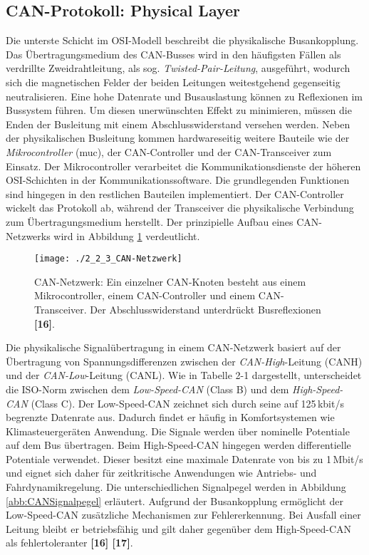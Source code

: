 \subsection{CAN-Protokoll: Physical Layer} \label{subsec:PhysicalLayer}
Die unterste Schicht im \acs{OSI}-Modell beschreibt die physikalische Busankopplung. Das Übertragungsmedium des \acs{CAN}-Busses wird in den häufigsten Fällen als verdrillte Zweidrahtleitung, als sog. \emph{Twisted-Pair-Leitung}, ausgeführt, wodurch sich die magnetischen Felder der beiden Leitungen weitestgehend gegenseitig neutralisieren. Eine hohe Datenrate und Busauslastung können zu Reflexionen im Bussystem führen. Um diesen unerwünschten Effekt zu minimieren, müssen die Enden der Busleitung mit einem Abschlusswiderstand versehen werden. Neben der physikalischen Busleitung kommen hardwareseitig weitere Bauteile wie der \emph{Mikrocontroller} (\acs{muc}), der \acs{CAN}-Controller und der \acs{CAN}-Transceiver zum Einsatz. Der Mikrocontroller verarbeitet die Kommunikationsdienste der höheren \acs{OSI}-Schichten in der Kommunikationssoftware. Die grundlegenden Funktionen sind hingegen in den restlichen Bauteilen implementiert. Der \acs{CAN}-Controller wickelt das Protokoll ab, während der Transceiver die physikalische Verbindung zum Übertragungsmedium herstellt. Der prinzipielle Aufbau eines \acs{CAN}-Netzwerks wird in Abbildung \ref{abb:CANNetzwerk} verdeutlicht.

\begin{figure}[!htbp]
	\centering
	\texttt{[image: ./2\_2\_3\_CAN-Netzwerk]}
	\caption[CAN-Netzwerk]{CAN-Netzwerk: Ein einzelner \acs{CAN}-Knoten besteht aus einem Mikrocontroller, einem \acs{CAN}-Controller und einem \acs{CAN}-Transceiver. Der Abschlusswiderstand unterdrückt	Busreflexionen \textbf{[16]}.}
	\label{abb:CANNetzwerk}
\end{figure}

Die physikalische Signalübertragung in einem \acs{CAN}-Netzwerk basiert auf der Übertragung von Spannungsdifferenzen zwischen der \emph{\acs{CAN}-High}-Leitung (CANH) und der \emph{\acs{CAN}-Low}-Leitung (CANL). Wie in Tabelle 2-1 dargestellt, unterscheidet die \acs{ISO}-Norm zwischen dem \emph{Low-Speed-\acs{CAN}} (Class B) und dem \emph{High-Speed-\acs{CAN}} (Class C). Der Low-Speed-\acs{CAN} zeichnet sich durch seine auf 125\,kbit/s begrenzte Datenrate aus. Dadurch findet er häufig in Komfortsystemen wie Klimasteuergeräten Anwendung. Die Signale werden über nominelle Potentiale auf dem Bus übertragen. Beim High-Speed-\acs{CAN} hingegen werden differentielle Potentiale verwendet. Dieser besitzt eine maximale Datenrate von bis zu 1\,Mbit/s und eignet sich daher für zeitkritische Anwendungen wie Antriebs- und Fahrdynamikregelung. Die unterschiedlichen Signalpegel werden in Abbildung \ref{abb:CANSignalpegel} erläutert. Aufgrund der Busankopplung ermöglicht der Low-Speed-\acs{CAN} zusätzliche Mechanismen zur Fehlererkennung. Bei Ausfall einer Leitung bleibt er betriebsfähig und gilt daher gegenüber dem High-Speed-\acs{CAN} als fehlertoleranter \textbf{[16] [17]}.

